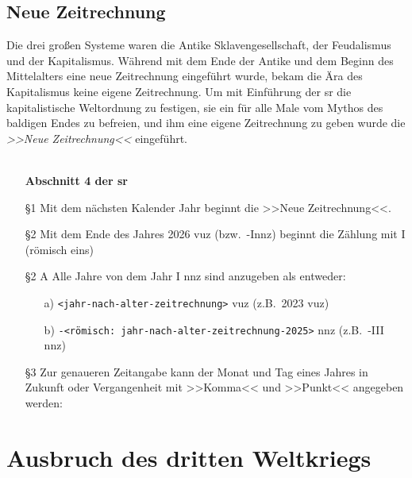 \subsection{Neue Zeitrechnung} 
Die drei großen Systeme waren die Antike Sklavengesellschaft, der Feudalismus
und der Kapitalismus. 
Während mit dem Ende der Antike und dem Beginn des Mittelalters eine neue
Zeitrechnung eingeführt wurde, bekam die Ära des Kapitalismus keine eigene
Zeitrechnung. 
Um mit Einführung der \ac{sr} die kapitalistische Weltordnung zu festigen, sie
ein für alle Male vom Mythos des baldigen Endes zu befreien, und ihm eine eigene
Zeitrechnung zu geben wurde die \emph{>>Neue Zeitrechnung<<} eingeführt.\\\\
% 
\begin{itemize}
  \item[] \textbf{Abschnitt 4 der \ac{sr}}
  \item[§1] Mit dem nächsten Kalender Jahr beginnt die >>Neue Zeitrechnung<<.
  \item[§2] Mit dem Ende des Jahres 2026 \ac{vuz} (bzw.~-I\ac{nnz}) beginnt die
    Zählung mit I (römisch eins)
  \item[§2 A] Alle Jahre von dem Jahr I \ac{nnz} sind anzugeben als entweder: 
    \begin{itemize}
      \item[a)] {\footnotesize \texttt{<jahr-nach-alter-zeitrechnung>} \ac{vuz}} (z.B.~2023 \ac{vuz}) 
      \item[b)] {\footnotesize \texttt{-<römisch: jahr-nach-alter-zeitrechnung-2025>} \ac{nnz}}
        (z.B.~-III \ac{nnz})
    \end{itemize}
  \item[§3] Zur genaueren Zeitangabe kann der Monat und Tag eines Jahres in
    Zukunft oder Vergangenheit mit >>Komma<< und >>Punkt<< angegeben werden: 
\end{itemize}

\section{Ausbruch des dritten Weltkriegs}


